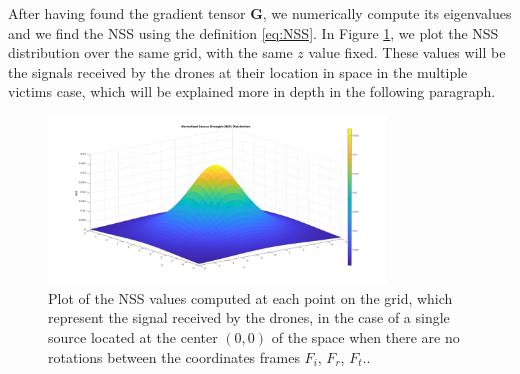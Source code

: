 After having found the gradient tensor $\mathbf{G}$, we numerically
compute its eigenvalues and we find the NSS using the definition \ref{eq:NSS}.
In Figure \ref{fig:NSS_single_anal}, we plot the NSS distribution over the same grid,
with the same $z$ value fixed.
These values will be the signals received by the drones at their location
in space in the multiple victims case, which will be explained more in depth in the following paragraph.
\begin{figure}
\centering
\includegraphics[width=0.8\textwidth]{images/NSS_single_anal.jpg}
\caption{Plot of the NSS values computed at each point on the grid, which
represent the signal received by the drones, in the case of a single source located
at the center $(0,0)$ of the space when there are no rotations between the coordinates
frames $F_i$, $F_r$, $F_t$..}
\label{fig:NSS_single_anal}
\end{figure}

